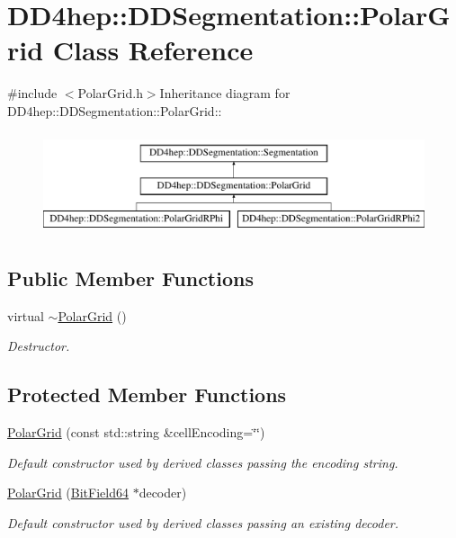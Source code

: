 \hypertarget{class_d_d4hep_1_1_d_d_segmentation_1_1_polar_grid}{
\section{DD4hep::DDSegmentation::PolarGrid Class Reference}
\label{class_d_d4hep_1_1_d_d_segmentation_1_1_polar_grid}
}


{\ttfamily \#include $<$PolarGrid.h$>$}Inheritance diagram for DD4hep::DDSegmentation::PolarGrid::\begin{figure}[H]
\begin{center}
\leavevmode
\includegraphics[height=3cm]{class_d_d4hep_1_1_d_d_segmentation_1_1_polar_grid}
\end{center}
\end{figure}
\subsection*{Public Member Functions}
\begin{DoxyCompactItemize}
\item 
virtual \hyperlink{class_d_d4hep_1_1_d_d_segmentation_1_1_polar_grid_a894846ac7aeb9478a22e7bb0687178d8}{$\sim$PolarGrid} ()
\begin{DoxyCompactList}\small\item\em Destructor. \item\end{DoxyCompactList}\end{DoxyCompactItemize}
\subsection*{Protected Member Functions}
\begin{DoxyCompactItemize}
\item 
\hyperlink{class_d_d4hep_1_1_d_d_segmentation_1_1_polar_grid_ac8fe161b5a7730ac7bf6f3a3a45f70a6}{PolarGrid} (const std::string \&cellEncoding=\char`\"{}\char`\"{})
\begin{DoxyCompactList}\small\item\em Default constructor used by derived classes passing the encoding string. \item\end{DoxyCompactList}\item 
\hyperlink{class_d_d4hep_1_1_d_d_segmentation_1_1_polar_grid_a292c46648971f17f21fa556425d1fd66}{PolarGrid} (\hyperlink{class_d_d4hep_1_1_d_d_segmentation_1_1_bit_field64}{BitField64} $\ast$decoder)
\begin{DoxyCompactList}\small\item\em Default constructor used by derived classes passing an existing decoder. \item\end{DoxyCompactList}\end{DoxyCompactItemize}


